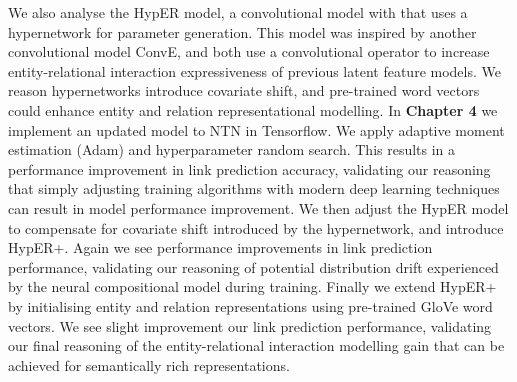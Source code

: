 We also analyse the HypER model, a convolutional model with that uses a hypernetwork for parameter generation. This model was inspired by another convolutional model ConvE, and both use a convolutional operator to increase entity-relational interaction expressiveness of previous latent feature models. We reason hypernetworks introduce covariate shift, and pre-trained word vectors could enhance entity and relation representational modelling. \newline
In \textbf{Chapter 4} we implement an updated model to NTN in Tensorflow. We apply adaptive moment estimation (Adam) and hyperparameter random search. This results in a performance improvement in link prediction accuracy, validating our reasoning that simply adjusting training algorithms with modern deep learning techniques can result in model performance improvement. We then adjust the HypER model to compensate for covariate shift introduced by the hypernetwork, and introduce HypER+. Again we see performance improvements in link prediction performance, validating our reasoning of potential distribution drift experienced by the neural compositional model during training. Finally we extend HypER+ by initialising entity and relation representations using pre-trained GloVe word vectors. We see slight improvement our link prediction performance, validating our final reasoning of the entity-relational interaction modelling gain that can be achieved for semantically rich representations. \bigskip
